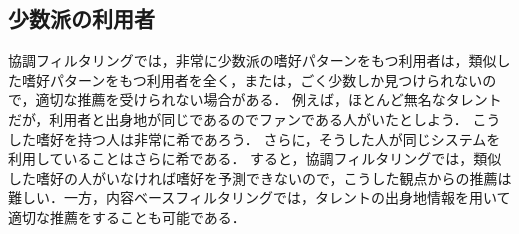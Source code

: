 \subsection{少数派の利用者}

協調フィルタリングでは，非常に少数派の嗜好パターンをもつ利用者は，類似した嗜好パターンをもつ利用者を全く，または，ごく少数しか見つけられないので，適切な推薦を受けられない場合がある．
例えば，ほとんど無名なタレントだが，利用者と出身地が同じであるのでファンである人がいたとしよう．
こうした嗜好を持つ人は非常に希であろう．
さらに，そうした人が同じシステムを利用していることはさらに希である．
すると，協調フィルタリングでは，類似した嗜好の人がいなければ嗜好を予測できないので，こうした観点からの推薦は難しい．一方，内容ベースフィルタリングでは，タレントの出身地情報を用いて適切な推薦をすることも可能である．
